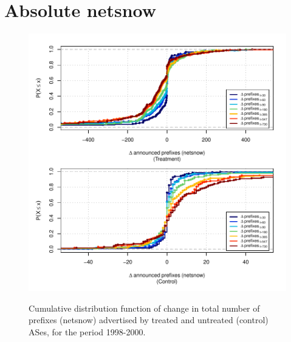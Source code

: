 \clearpage
\section{Absolute netsnow}

\begin{figure}[H]
\begin{centering}
\begin{singlespace}
\captionsetup{list=no}
    \includegraphics[width=6in]{figures/behavior-netsnow-1998_2000-corr.pdf}
    \vspace{-2em}\\
    \caption{Cumulative distribution function of change in total number of
    prefixes (netsnow) advertised by treated and untreated (control) ASes, for
    the period 1998-2000.}
\end{singlespace}
\end{centering}
\end{figure}

